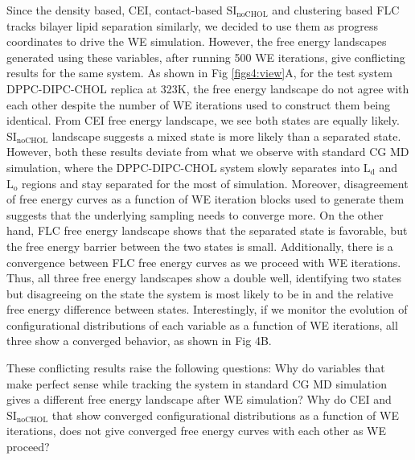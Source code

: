 \documentclass{biophys-new}
\begin{document}
Since the density based, CEI, contact-based $\text{SI}_{\text{noCHOL}}$ and clustering based FLC tracks bilayer lipid separation similarly,
we decided to use them as progress coordinates to drive the WE simulation.
However, the free energy landscapes generated using these variables, after running 500 WE iterations, give conflicting results for the same system.
As shown in Fig \ref{figs4:view}A, for the test system DPPC-DIPC-CHOL replica at 323K, the free energy landscape do not agree with each other despite the number of WE iterations used to construct them being identical.
From CEI free energy landscape, we see both states are equally likely.
$\text{SI}_{\text{noCHOL}}$ landscape suggests a mixed state is more likely than a separated state.
However, both these results deviate from what we observe with standard CG MD simulation,
where the DPPC-DIPC-CHOL system slowly separates into $\text{L}_{\text{d}}$ and $\text{L}_{\text{o}}$ regions and stay separated for the most of simulation.
Moreover, disagreement of free energy curves as a function of WE iteration blocks used to generate them suggests that the underlying sampling needs to converge more.
On the other hand, FLC free energy landscape shows that the separated state is favorable, but the free energy barrier between the two states is small.
Additionally, there is a convergence between FLC free energy curves as we proceed with WE iterations.
Thus, all three free energy landscapes show a double well, identifying two states but disagreeing on the state the system is most likely to be in and the relative free energy difference between states.
Interestingly, if we monitor the evolution of configurational distributions of each variable as a function of WE iterations, all three show a converged behavior, as shown in Fig 4B.

These conflicting results raise the following questions: Why do variables that make perfect sense while tracking the system in standard CG MD simulation gives a different free energy landscape after WE simulation?
Why do CEI and $\text{SI}_{\text{noCHOL}}$ that show converged configurational distributions as a function of WE iterations, does not give converged free energy curves with each other as WE proceed?
\end{document}
